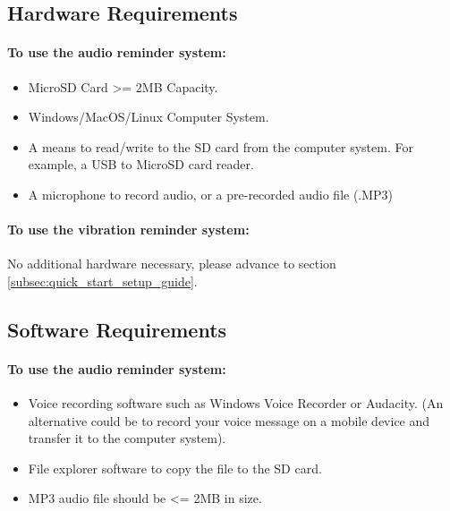 		\subsection{Hardware Requirements}
		\label{subsec:quick_start_guide_hardware}

			\paragraph{To use the audio reminder system:}\mbox{}

			\begin{itemize}
				\item MicroSD Card >= 2MB Capacity.
				\item Windows/MacOS/Linux Computer System.
				\item A means to read/write to the SD card from the computer system. For example, a USB to MicroSD card reader.
				\item A microphone to record audio, or a pre-recorded audio file (.MP3)
			\end{itemize}

			\paragraph{To use the vibration reminder system:}\mbox{}

			No additional hardware necessary, please advance to section \ref{subsec:quick_start_setup_guide}.

		\subsection{Software Requirements}
		\label{subsec:quick_start_guide_software}

			\paragraph{To use the audio reminder system:}\mbox{}

			\begin{itemize}
				\item Voice recording software such as Windows Voice Recorder or Audacity. (An alternative could be to record your voice message on a mobile device and transfer it to the computer system).
				\item File explorer software to copy the file to the SD card.
				\item MP3 audio file should be <= 2MB in size.
			\end{itemize}


